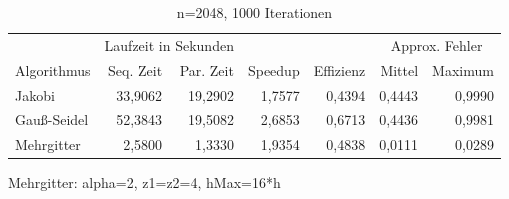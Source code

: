 \documentclass[paper = a4]{scrartcl}
\begin{document}
\begin{table}
    \centering
    \begin{tabular}{|l|r|r|r|r|r|r|} \hline
    & \multicolumn{2}{c|}{Laufzeit in Sekunden} & & & \multicolumn{2}{c|}{Approx. Fehler} \\
    Algorithmus & Seq. Zeit & Par. Zeit & Speedup & Effizienz & Mittel   & Maximum \\ \hline \hline
    Jakobi      & 33,9062   & 19,2902   & 1,7577  & 0,4394    & 0,4443   & 0,9990  \\
    Gauß-Seidel & 52,3843   & 19,5082   & 2,6853  & 0,6713    & 0,4436   & 0,9981  \\
    Mehrgitter  & 2,5800    & 1,3330    & 1,9354  & 0,4838    & 0,0111   & 0,0289  \\ \hline
    \end{tabular}
    \caption{n=2048, 1000 Iterationen}
\end{table}
Mehrgitter: alpha=2, z1=z2=4, hMax=16*h
\end{document}
